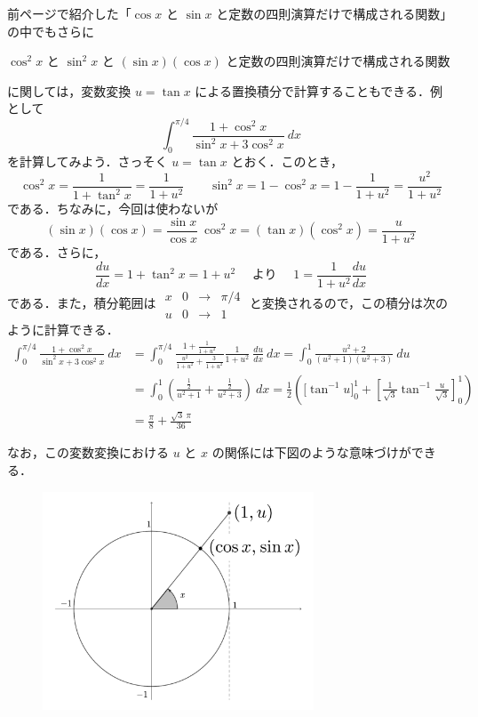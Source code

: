 \documentclass[10pt, uplatex, dvipdfmx]{jsarticle}
\theoremstyle{definition}
\numberwithin{equation}{section}
\newcommand{\ds}{\displaystyle}
\begin{document}
\newpage

前ページで紹介した「$\cos x$ と $\sin x$ と定数の四則演算だけで構成される関数」の中でもさらに
\begin{center}
  $\cos^2 x$ と $\sin^2 x$ と $\left( \sin x \right) \left(\cos x\right)$ と定数の四則演算だけで構成される関数
\end{center}
に関しては，変数変換 $\ds u=\tan x$ による置換積分で計算することもできる．例として
\[
  \int_{0}^{\pi/4} \frac{1+\cos^2x}{\sin^2 x + 3 \cos^2 x} \ dx
\]
を計算してみよう．さっそく $\ds u=\tan x$ とおく．このとき，
\[
  \cos^2 x = \frac{1}{1+\tan^2 x} = \frac{1}{1+u^2} \qquad \sin^2 x = 1- \cos^2 x = 1- \frac{1}{1+u^2} = \frac{u^2}{1+u^2}
\]
である．ちなみに，今回は使わないが
\[
  \left( \sin x \right) \left(\cos x\right) = \frac{\sin x}{\cos x}~ \cos^2 x = \left( \tan x \right)\left( \cos^2 x\right)
  = \frac{u}{1+u^2}
\]
である．さらに，
\[
  \frac{du}{dx} = 1+\tan^2 x = 1+u^2 \quad \text{ より } \quad 1 = \frac{1}{1+u^2} \frac{du}{dx} 
\]
である．また，積分範囲は $
\begin{array}{c|ccc}
  x & 0 & \to & \pi/4\\ \hline
  u & 0 & \to & 1
\end{array}
$ と変換されるので，この積分は次のように計算できる．
\[
  \begin{aligned}
    \int_{0}^{\pi/4} \frac{1+\cos^2x}{\sin^2 x + 3 \cos^2 x} \ dx
    &= \int_{0}^{\pi/4} \frac{1+ \frac{1}{1+u^2}}{ \frac{u^2}{1+u^2} + \frac{3}{1+u^2}} \frac{1}{1+u^2}~ \frac{du}{dx} \ dx
      = \int_{0}^{1} \frac{u^2+2}{(u^2+1)(u^2+3)} \ du\\[2ex]
    &= \int_{0}^{1}\left(\frac{\frac{1}{2}}{u^2+1} + \frac{\frac{1}{2}}{u^2+3}\right) \ dx 
      = \frac{1}{2}\left( \Big[ \tan^{-1}u \Big]_{0}^{1} + \left[ \frac{1}{\sqrt{3}}
      \tan^{-1}\frac{u}{\sqrt{3}}\right]_{0}^{1}\right)\\[2ex]
    &=\frac{\pi}{8}  + \frac{\sqrt{3}~\pi}{36}
  \end{aligned}
\]

なお，この変数変換における $u$ と $x$ の関係には下図のような意味づけができる．
\begin{figure}[h]
  \centering
  \includegraphics[height=6.5cm]{./pictures/03/u-tanx.pdf}
\end{figure}
\end{document}

